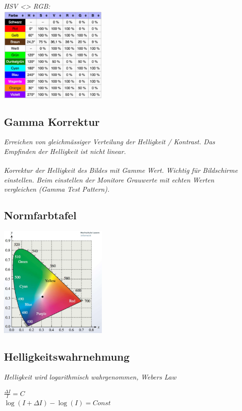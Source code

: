 \textit{HSV <> RGB: }\\
\includegraphics[width=0.4\textwidth]{assets/hsv-rgb.png}

\subsection{Gamma Korrektur}

\textit{
    Erreichen von gleichmässiger Verteilung der Helligkeit / Kontrast.
    Das Empfinden der Helligkeit ist nicht linear.
} \\
\\
\textit{
    Korrektur der Helligkeit des Bildes mit Gamme Wert. Wichtig für Bildschirme einstellen.
    Beim einstellen der Monitore Grauwerte mit echten Werten vergleichen (Gamma Test Pattern).
}

\subsection{Normfarbtafel}

\includegraphics[width=0.4\textwidth]{assets/color-cie.png}

\subsection{Helligkeitswahrnehmung}

\textit{Helligkeit wird logarithmisch wahrgenommen, Webers Law}

$\frac{\Delta I}{I} = C$ \\
$\log (I + \Delta I) - \log(I) = Const$

